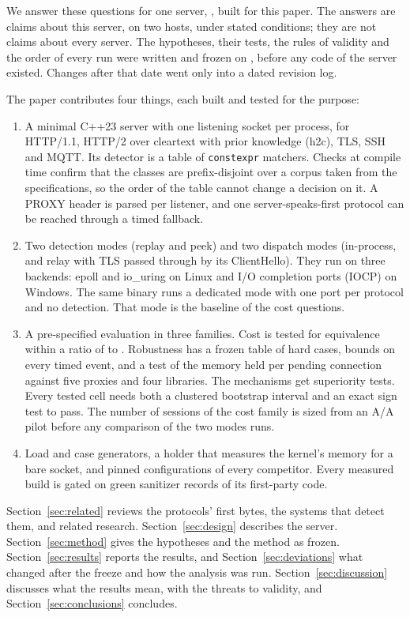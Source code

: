 We answer these questions for one server, \oneport, built for this paper. The answers are claims
about this server, on two hosts, under stated conditions; they are not claims about every
server. The hypotheses, their tests, the rules of validity and the order of every run were
written and frozen on \FrozenDate, before any code of the server existed. Changes after that date
went only into a dated revision log.

The paper contributes four things, each built and tested for the purpose:
\begin{enumerate}
\item A minimal C++23 server with one listening socket per process, for HTTP/1.1, HTTP/2 over
cleartext with prior knowledge (h2c), TLS, SSH and MQTT. Its detector is a table of
\texttt{constexpr} matchers. Checks at compile time confirm that the classes are prefix-disjoint
over a corpus taken from the specifications, so the order of the table cannot change a decision
on it. A PROXY header is parsed per listener, and one server-speaks-first protocol can be reached
through a timed fallback.
\item Two detection modes (replay and peek) and two dispatch modes (in-process, and relay with TLS
passed through by its ClientHello). They run on three backends: epoll and io\_uring on Linux and
I/O completion ports (IOCP) on Windows. The same binary runs a dedicated mode with one port per
protocol and no detection. That mode is the baseline of the cost questions.
\item A pre-specified evaluation in three families. Cost is tested for equivalence within a ratio
of \MarginLow{} to \MarginHigh. Robustness has a frozen table of \HardCases{} hard cases, bounds on
every timed event, and a test of the memory held per pending connection against five proxies and
four libraries. The mechanisms get superiority tests. Every tested cell needs both a clustered
bootstrap interval and an exact sign test to pass. The number of sessions of the cost family is
sized from an A/A pilot before any comparison of the two modes runs.
\item Load and case generators, a holder that measures the kernel's memory for a bare socket, and
pinned configurations of every competitor. Every measured build is gated on green sanitizer
records of its first-party code.
\end{enumerate}

Section~\ref{sec:related} reviews the protocols' first bytes, the systems that detect them, and
related research. Section~\ref{sec:design} describes the server. Section~\ref{sec:method} gives
the hypotheses and the method as frozen. Section~\ref{sec:results} reports the results, and
Section~\ref{sec:deviations} what changed after the freeze and how the analysis was run.
Section~\ref{sec:discussion} discusses what the results mean, with the threats to validity, and
Section~\ref{sec:conclusions} concludes.
